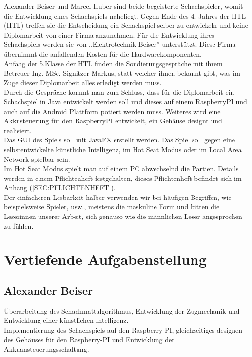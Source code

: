 \documentclass[12pt,a4paper]{article}
\begin{document}
	Alexander Beiser und Marcel Huber sind beide begeisterte Schachspieler, womit die Entwicklung eines Schachspiels naheliegt. Gegen Ende des 4. Jahres der HTL (\acl{HTL}) treffen sie die Entscheidung ein Schachspiel selber zu entwickeln und keine Diplomarbeit von einer Firma anzunehmen. Für die Entwicklung ihres Schachspiels werden sie von ,,Elektrotechnik Beiser'' unterstützt. Diese Firma übernimmt die anfallenden Kosten für die Hardwarekomponenten.\\
	Anfang der 5.Klasse der HTL finden die Sondierungsgespräche mit ihrem Betreuer Ing. MSc. Signitzer Markus, statt 
welcher ihnen bekannt gibt, was im Zuge dieser Diplomarbeit alles erledigt werden muss. \\
Durch die Gespräche kommt man zum Schluss, dass für die Diplomarbeit ein Schachspiel in Java entwickelt werden soll und dieses auf einem RaspberryPI und auch auf die Android Plattform potiert werden muss. Weiteres wird eine Akkusteuerung für den RaspberryPI entwickelt, ein Gehäuse designt und realisiert. \\
	Das  \acl{GUI} des Spiels soll mit JavaFX erstellt werden. Das Spiel soll gegen eine selbstentwickelte künstliche Intelligenz, im Hot Seat Modus oder im Local Area Network spielbar sein. \\
	Im Hot Seat Modus spielt man auf einem PC abwechselnd die Partien.
	Details werden in einem Pflichtenheft festgehalten, dieses Pflichtenheft befindet sich im Anhang (\ref{SEC:PFLICHTENHEFT}).\\[1ex]
	Der einfacheren Lesbarkeit halber verwenden wir bei häufigen
Begriffen, wie beispielsweise Spieler, usw., meistens die maskuline Form und bitten die
Leserinnen unserer Arbeit, sich genauso wie die männlichen Leser angesprochen zu fühlen.
	
	\newpage
\section{Vertiefende Aufgabenstellung}
 \subsection{Alexander Beiser}
 	Überarbeitung des Schachmattalgorithmus, Entwicklung der Zugmechanik und Entwicklung einer künstlichen Intelligenz. \\
Implementierung des Schachspiels auf den Raspberry-PI, gleichzeitiges designen des Gehäuses für den Raspberry-PI und Entwicklung der Akkuansteuerungsschaltung. 
	
\end{document}
